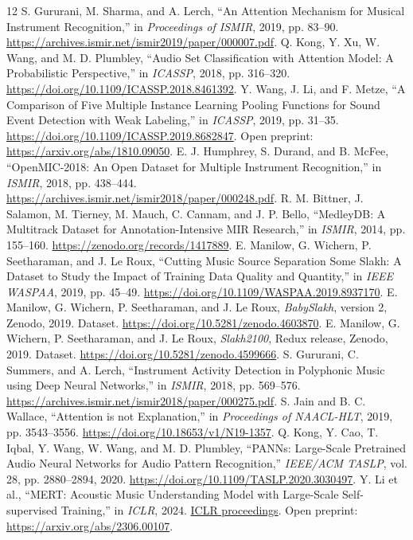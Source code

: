 \begin{thebibliography}{12}
 S. Gururani, M. Sharma, and A. Lerch,
``An Attention Mechanism for Musical Instrument Recognition,''
in \emph{Proceedings of ISMIR}, 2019, pp. 83--90.
\url{https://archives.ismir.net/ismir2019/paper/000007.pdf}.
 Q. Kong, Y. Xu, W. Wang, and M. D. Plumbley,
``Audio Set Classification with Attention Model: A Probabilistic Perspective,''
in \emph{ICASSP}, 2018, pp. 316--320.
\url{https://doi.org/10.1109/ICASSP.2018.8461392}.
 Y. Wang, J. Li, and F. Metze,
``A Comparison of Five Multiple Instance Learning Pooling Functions for Sound
Event Detection with Weak Labeling,'' in \emph{ICASSP}, 2019, pp. 31--35.
\url{https://doi.org/10.1109/ICASSP.2019.8682847}. Open preprint: \url{https://arxiv.org/abs/1810.09050}.
 E. J. Humphrey, S. Durand, and B. McFee,
``OpenMIC-2018: An Open Dataset for Multiple Instrument Recognition,''
in \emph{ISMIR}, 2018, pp. 438--444.
\url{https://archives.ismir.net/ismir2018/paper/000248.pdf}.
 R. M. Bittner, J. Salamon, M. Tierney, M. Mauch,
C. Cannam, and J. P. Bello, ``MedleyDB: A Multitrack Dataset for
Annotation-Intensive MIR Research,'' in \emph{ISMIR}, 2014, pp. 155--160.
\url{https://zenodo.org/records/1417889}.
 E. Manilow, G. Wichern, P. Seetharaman, and J. Le Roux,
``Cutting Music Source Separation Some Slakh: A Dataset to Study the Impact of Training Data Quality and Quantity,''
in \emph{IEEE WASPAA}, 2019, pp. 45--49.
\url{https://doi.org/10.1109/WASPAA.2019.8937170}.
 E. Manilow, G. Wichern, P. Seetharaman, and J. Le Roux,
\emph{BabySlakh}, version 2, Zenodo, 2019. Dataset.
\url{https://doi.org/10.5281/zenodo.4603870}.
 E. Manilow, G. Wichern, P. Seetharaman, and J. Le Roux,
\emph{Slakh2100}, Redux release, Zenodo, 2019. Dataset.
\url{https://doi.org/10.5281/zenodo.4599666}.
 S. Gururani, C. Summers, and A. Lerch,
``Instrument Activity Detection in Polyphonic Music using Deep Neural Networks,''
in \emph{ISMIR}, 2018, pp. 569--576.
\url{https://archives.ismir.net/ismir2018/paper/000275.pdf}.
 S. Jain and B. C. Wallace,
``Attention is not Explanation,'' in \emph{Proceedings of NAACL-HLT},
2019, pp. 3543--3556.
\url{https://doi.org/10.18653/v1/N19-1357}.
 Q. Kong, Y. Cao, T. Iqbal, Y. Wang, W. Wang, and M. D. Plumbley,
``PANNs: Large-Scale Pretrained Audio Neural Networks for Audio Pattern Recognition,''
\emph{IEEE/ACM TASLP}, vol. 28, pp. 2880--2894, 2020.
\url{https://doi.org/10.1109/TASLP.2020.3030497}.
 Y. Li et al., ``MERT: Acoustic Music Understanding Model with
Large-Scale Self-supervised Training,'' in \emph{ICLR}, 2024.
\href{https://proceedings.iclr.cc/paper_files/paper/2024/file/33dffa2e3d2ab74a783d1a8c292f66d9-Paper-Conference.pdf}{ICLR proceedings}. Open preprint: \url{https://arxiv.org/abs/2306.00107}.
\end{thebibliography}
